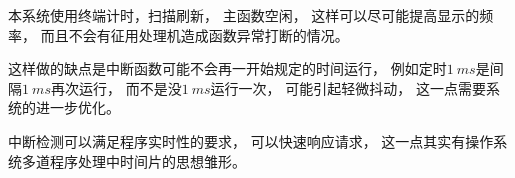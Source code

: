\documentclass[../main.tex]{subfiles} %
\begin{document}
本系统使用终端计时，扫描刷新，
主函数空闲，
这样可以尽可能提高显示的频率，
而且不会有征用处理机造成函数异常打断的情况。

这样做的缺点是中断函数可能不会再一开始规定的时间运行，
例如定时$\SI{1}{ms}$是间隔$\SI{1}{ms}$再次运行，
而不是没$\SI{1}{ms}$运行一次，
可能引起轻微抖动，
这一点需要系统的进一步优化。

中断检测可以满足程序实时性的要求，
可以快速响应请求，
这一点其实有操作系统多道程序处理中时间片的思想雏形。
\end{document}
